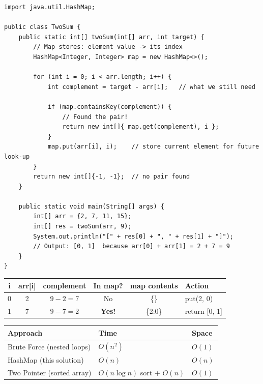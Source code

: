 \documentclass[12pt,a4paper,oneside]{book}
\begin{document}
\begin{lstlisting}[caption={Two Sum --- HashMap approach O(n) time O(n) space}]
import java.util.HashMap;

public class TwoSum {
    public static int[] twoSum(int[] arr, int target) {
        // Map stores: element value -> its index
        HashMap<Integer, Integer> map = new HashMap<>();

        for (int i = 0; i < arr.length; i++) {
            int complement = target - arr[i];   // what we still need

            if (map.containsKey(complement)) {
                // Found the pair!
                return new int[]{ map.get(complement), i };
            }
            map.put(arr[i], i);    // store current element for future look-up
        }
        return new int[]{-1, -1};  // no pair found
    }

    public static void main(String[] args) {
        int[] arr = {2, 7, 11, 15};
        int[] res = twoSum(arr, 9);
        System.out.println("[" + res[0] + ", " + res[1] + "]");
        // Output: [0, 1]  because arr[0] + arr[1] = 2 + 7 = 9
    }
}
\end{lstlisting}

\begin{dryrun}[Dry Run: arr = \{2, 7, 11, 15\}, target = 9]
\begin{center}
\begin{tabular}{cccccl}
\toprule
\textbf{i} & \textbf{arr[i]} & \textbf{complement} & \textbf{In map?} & \textbf{map contents} & \textbf{Action}\\
\midrule
0 & 2  & $9-2=7$  & No       & \{\}          & put(2, 0)\\
1 & 7  & $9-7=2$  & \textbf{Yes!} & \{2:0\}  & return [0, 1]\\
\bottomrule
\end{tabular}
\end{center}
\end{dryrun}

\begin{complexity}
\begin{center}
\begin{tabular}{lll}
\toprule
\textbf{Approach} & \textbf{Time} & \textbf{Space}\\
\midrule
Brute Force (nested loops) & $O(n^2)$       & $O(1)$\\
HashMap (this solution)    & $O(n)$         & $O(n)$\\
Two Pointer (sorted array) & $O(n \log n)$ sort + $O(n)$ & $O(1)$\\
\bottomrule
\end{tabular}
\end{center}
\end{complexity}
\end{document}
